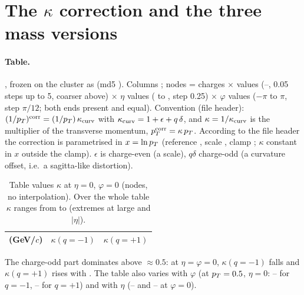 \section{The $\kappa$ correction and the three mass versions}
\label{sec:kappa}

\paragraph{Table.} , frozen on the cluster as
 (md5 ). Columns
; \TabRows{} nodes = \TabNq{} charges $\times$ \TabNpt{} \pt{} values
(\TabPtMin--\TabPtMax\gevc, 0.05\gevc{} steps up to 5\gevc, coarser above) $\times$ \TabNeta{} $\eta$ values (\TabEtaMin{} to
\TabEtaMax, step 0.25) $\times$ \TabNphi{} $\varphi$ values ($-\pi$ to $\pi$, step $\pi/12$; both ends present and equal).
Convention (file header): $(1/p_T)^{\rm corr}=(1/p_T)\,\kappa_{\rm curv}$ with $\kappa_{\rm curv}=1+\epsilon+q\,\delta$, and
$\kappa=1/\kappa_{\rm curv}$ is the multiplier of the transverse momentum, $p_T^{\rm corr}=\kappa\,p_T$. According to the file header the
correction is parametrised in $x=\ln p_T$ (reference \TabXref, scale \TabXscale, clamp \TabXclamp; $\kappa$ constant in $x$ outside
the clamp).
$\epsilon$ is charge-even (a scale), $q\delta$ charge-odd (a curvature offset, i.e.\ a sagitta-like distortion).

\begin{table}[H]
\centering\small
\caption{Table values $\kappa$ at $\eta=0$, $\varphi=0$ (nodes, no interpolation). Over the whole table $\kappa$ ranges from
\TabKMin{} to \TabKMax{} (extremes at large \pt{} and $|\eta|$).}
\label{tab:knodes}
\begin{tabular}{lcc}
\toprule
\pt{} (GeV/$c$) & $\kappa(q=-1)$ & $\kappa(q=+1)$ \\
\midrule

\bottomrule
\end{tabular}
\end{table}

The charge-odd part dominates above $\approx0.5$\gevc: at $\eta=\varphi=0$, $\kappa(q=-1)$ falls and $\kappa(q=+1)$ rises with
\pt{}. The table also varies with $\varphi$ (at $p_T=0.5$\gevc, $\eta=0$: \TabPhiLoMinus--\TabPhiHiMinus{} for $q=-1$,
\TabPhiLoPlus--\TabPhiHiPlus{} for $q=+1$) and with $\eta$ (\TabEtaLoMinus--\TabEtaHiMinus{} and \TabEtaLoPlus--\TabEtaHiPlus{}
at $\varphi=0$).

